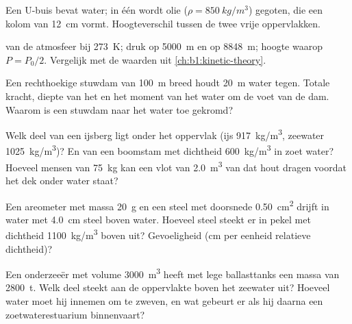 \begin{exercise}[$\star$]\label{exo:b1:fluid-statics:4}
Een U-buis bevat water; in één  wordt olie ($\rho = \qty{850}{kg/m^3}$)
gegoten, die een kolom van \qty{12}{cm} vormt. Hoogteverschil tussen de
twee vrije oppervlakken.
\end{exercise}

\begin{exercise}[$\star\star$]\label{exo:b1:fluid-statics:5}
 van de atmosfeer bij \qty{273}{K}; druk op \qty{5000}{m}
en op \qty{8848}{m}; hoogte waarop $P = P_0/2$. Vergelijk met de
waarden uit \cref{ch:b1:kinetic-theory}.
\end{exercise}

\begin{exercise}[$\star\star$]\label{exo:b1:fluid-statics:6}
Een rechthoekige stuwdam van \qty{100}{m} breed houdt \qty{20}{m} water tegen. Totale
kracht, diepte van het  en het moment van het water
om de voet van de dam. Waarom is een stuwdam naar het water toe gekromd?
\end{exercise}

\begin{exercise}[$\star\star$]\label{exo:b1:fluid-statics:7}
Welk deel van een ijsberg ligt onder het oppervlak (ijs \qty{917}{kg/m^3}, zeewater
\qty{1025}{kg/m^3})? En van een boomstam met dichtheid \qty{600}{kg/m^3} in zoet water?
Hoeveel mensen van \qty{75}{kg} kan een vlot van \qty{2.0}{m^3} van dat hout
dragen voordat het dek onder water staat?
\end{exercise}

\begin{exercise}[$\star\star$]\label{exo:b1:fluid-statics:8}
Een areometer met massa \qty{20}{g} en een steel met doorsnede
\qty{0.50}{cm^2} drijft in water met \qty{4.0}{cm} steel boven water.
Hoeveel steel steekt er in pekel met dichtheid \qty{1100}{kg/m^3} boven uit? Gevoeligheid
(cm per eenheid relatieve dichtheid)?
\end{exercise}

\begin{exercise}[$\star\star$]\label{exo:b1:fluid-statics:9}
Een onderzeeër met volume \qty{3000}{m^3} heeft met lege ballasttanks een massa
van \qty{2800}{t}. Welk deel steekt aan de oppervlakte boven het zeewater uit? Hoeveel
water moet hij innemen om te zweven, en wat gebeurt er als hij daarna
een zoetwaterestuarium binnenvaart?
\end{exercise}


